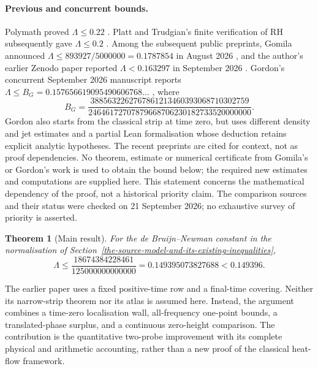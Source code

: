 \documentclass[11pt,a4paper]{article}
\newtheorem{theorem}{Theorem}
\begin{document}
\paragraph{Previous and concurrent bounds.}
Polymath proved $\Lambda\le0.22$ \cite{polymath}.
Platt and Trudgian's finite verification of RH subsequently gave
$\Lambda\le0.2$ \cite[Corollary 2]{pt}.
Among the subsequent public preprints, Gomila announced
$\Lambda\le893927/5000000=0.1787854$ in August 2026
\cite{gomila}, and the author's earlier Zenodo paper reported
$\Lambda<0.163297$ in September 2026 \cite{raymond}.
Gordon's concurrent September 2026 manuscript reports
$\Lambda\le B_G=0.157656619095490606768\ldots$ \cite{gordon}, where
\[
 B_G=\frac{3885632262767861213460393068710302759}
 {24646172707879668706230182733520000000}.
\]
Gordon also starts from the classical strip at time zero, but uses different
density and jet estimates and a partial Lean formalisation whose deduction
retains explicit analytic hypotheses. The recent preprints are cited for
context, not as proof dependencies. No theorem, estimate or numerical
certificate from Gomila's or Gordon's work is used to obtain the bound below;
the required new estimates and computations are supplied here. This statement
concerns the mathematical dependency of the proof, not a historical priority
claim. The comparison sources and their status were checked on
21 September 2026; no exhaustive survey of priority is asserted.

\begin{theorem}[Main result]\label{thm:main}
For the de Bruijn--Newman constant in the normalisation of
Section~\ref{the-source-model-and-its-existing-inequalities},
\[
\Lambda\le
\frac{18674384228461}{125000000000000}
=0.149395073827688<0.149396.
\]
\end{theorem}

The earlier paper \cite{raymond} uses a fixed positive-time row and a
final-time covering. Neither its narrow-strip theorem nor its atlas is
assumed here. Instead, the argument combines a time-zero localisation wall,
all-frequency one-point bounds, a translated-phase surplus, and a continuous
zero-height comparison. The contribution is the quantitative two-probe
improvement with its complete physical and arithmetic accounting, rather
than a new proof of the classical heat-flow framework.
\end{document}

